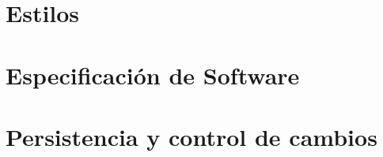 \documentclass[10pt]{book}
\author{Escuela Superior de Cómputo} %
\begin{document}
    \frontmatter
        \maketitle
        \tableofcontents
        \listofmacro
        \listofenviron
    \mainmatter
    

    
    \part{Estilos}
        
    \part{Especificación de Software}
        
        
    \part{Persistencia y control de cambios}
        
    
        
    
\end{document}
